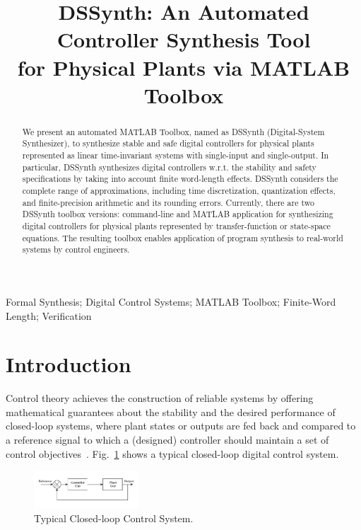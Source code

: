 \documentclass[10pt,conference]{IEEEtran}
\begin{document}
\title{DSSynth: An Automated Controller Synthesis Tool \\ for Physical Plants via MATLAB Toolbox}


\maketitle

\begin{abstract}
We present an automated MATLAB Toolbox, named as DSSynth 
(Digital-System Synthesizer), to synthesize stable and safe digital controllers 
for physical plants represented as linear time-invariant
systems with single-input and single-output. In particular, DSSynth synthesizes digital 
controllers w.r.t. the stability and safety specifications by taking into account finite word-length 
effects. DSSynth considers the complete range
of approximations, including time discretization, quantization effects, 
and finite-precision arithmetic and its rounding errors. 
Currently, there are two DSSynth toolbox versions: command-line and 
MATLAB application for synthesizing digital controllers for physical plants 
represented by transfer-function or state-space equations. The resulting toolbox 
enables application of program synthesis to real-world systems by control engineers.
\end{abstract}

%
%
\begin{IEEEkeywords}
Formal Synthesis; Digital Control Systems; MATLAB Toolbox; Finite-Word Length; Verification
\end{IEEEkeywords}

\section{Introduction}

Control theory achieves the construction of reliable systems by 
offering mathematical guarantees about the stability and the desired 
performance of closed-loop systems, where plant states or outputs 
are fed back and compared to a reference signal to which a (designed) 
controller should maintain a set of control objectives~\cite{astrom1997computer}. 
Fig.~\ref{fig:typical-control-system} shows a typical closed-loop digital control system.
%
\begin{figure}[ht!]
\centering
\includegraphics[width=0.35\textwidth]{closedloopseries.pdf}
\caption{Typical Closed-loop Control System.}
\label{fig:typical-control-system}
\end{figure}
\end{document}
